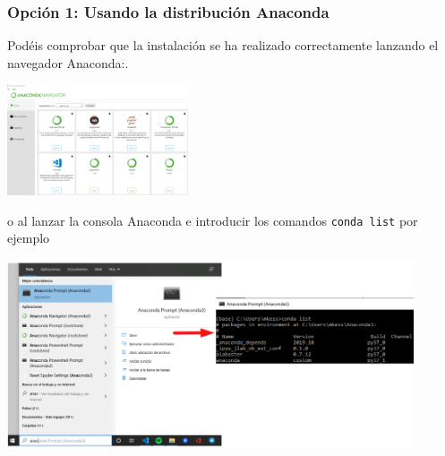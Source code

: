 \documentclass[9pt]{beamer}
\newcommand{\inlinecode}[2][Python]{\lstinline[language=#1, basicstyle=\color{mycodecolor}]{#2}}
\begin{document}
        \begin{frame}
            \frametitle{Opción 1: Usando la distribución Anaconda}
            Podéis comprobar que la instalación se ha realizado correctamente
            lanzando el navegador Anaconda:.
            
            \begin{center}
              \includegraphics[width=0.4\textwidth]{anaconda_navigator}
              
            \end{center}

            o al lanzar la consola  Anaconda e introducir los comandos
            \inlinecode[bash]{conda list} por ejemplo
            
            \begin{center}
              \includegraphics[width=0.9\textwidth]{check_anaconda_prompt}
            \end{center}
            
          \end{frame}
   
\end{document}
